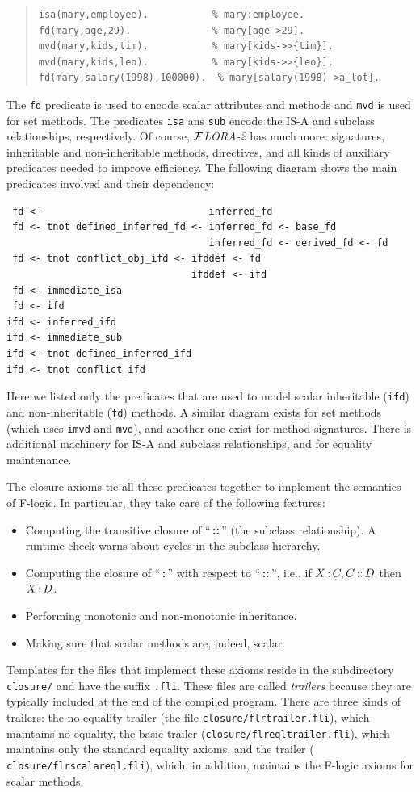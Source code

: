 \documentclass[11pt]{article}
\newcommand{\isa}{\,{\bf{:}}\,}
\newcommand{\subcl}{\,{\bf{::}}\,}
\newcommand{\FLORA}{{\mbox{${\cal F}${\small\it LORA}\rm\emph{-2}}}\xspace}
\newcommand{\fl}{\mbox{F-logic}\xspace}
\begin{document}
\begin{quote}
\begin{verbatim}
isa(mary,employee).           % mary:employee.
fd(mary,age,29).              % mary[age->29].
mvd(mary,kids,tim).           % mary[kids->>{tim}].
mvd(mary,kids,leo).           % mary[kids->>{leo}].
fd(mary,salary(1998),100000).  % mary[salary(1998)->a_lot].
\end{verbatim}
\end{quote}

The {\tt fd} predicate is used to encode scalar attributes and methods and
{\tt mvd} is used for set methods. The predicates {\tt isa} ans {\tt sub}
encode the IS-A and subclass relationships, respectively.
Of course, \FLORA has much more: signatures, inheritable and
non-inheritable methods, directives, and all kinds of auxiliary predicates
needed to improve efficiency. The following diagram shows the main
predicates involved and their dependency:
\begin{verbatim}
 fd <-                             inferred_fd
 fd <- tnot defined_inferred_fd <- inferred_fd <- base_fd
                                   inferred_fd <- derived_fd <- fd
 fd <- tnot conflict_obj_ifd <- ifddef <- fd
                                ifddef <- ifd
 fd <- immediate_isa
 fd <- ifd
ifd <- inferred_ifd
ifd <- immediate_sub
ifd <- tnot defined_inferred_ifd
ifd <- tnot conflict_ifd
\end{verbatim}
Here we listed only the predicates that are used to model scalar
inheritable ({\tt ifd}) and non-inheritable ({\tt fd}) methods.  A similar
diagram exists for set methods (which uses {\tt imvd} and {\tt mvd}), and
another one exist for method signatures. There is additional machinery for
IS-A and subclass relationships, and for equality maintenance.

The closure axioms tie all these predicates together to implement the
semantics of \fl. In particular, they take care of the following features:
\begin{itemize}
\item Computing the transitive closure of ``\subcl'' (the subclass
  relationship).  A runtime check warns about cycles in the subclass
  hierarchy.
\item Computing the closure of ``\isa'' with respect to ``\subcl'', i.e.,
  if $X\isa C, C\subcl D$ then $X\isa D$.
\item Performing monotonic and non-monotonic inheritance.
\item Making sure that scalar methods are, indeed, scalar.
\end{itemize}
Templates for the files that implement these axioms reside in the
subdirectory \texttt{closure/} and have the suffix {\tt .fli}.  These files
are called \emph{trailers} because they are typically included at the end
of the compiled program.  There are three kinds of trailers: the
no-equality trailer (the file {\tt closure/flrtrailer.fli}), which
maintains no equality, the basic trailer ({\tt closure/flreqltrailer.fli}),
which maintains only the standard equality axioms, and the trailer ({\tt
  closure/flrscalareql.fli}), which, in addition, maintains the \fl axioms
for scalar methods.
\end{document}
